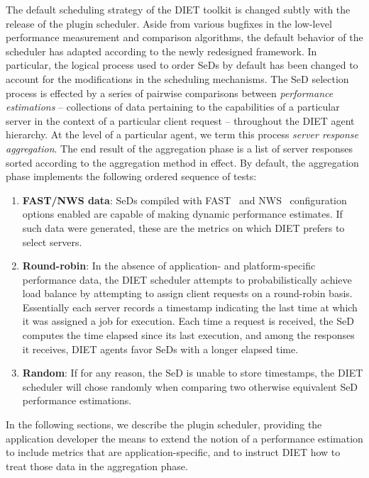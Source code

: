 The default scheduling strategy of the DIET toolkit is changed subtly
with the release of the plugin scheduler.  Aside from various bugfixes
in the low-level
performance measurement and comparison algorithms, the default
behavior of the scheduler has adapted according to the newly
redesigned framework.  In particular, the logical process used to
order SeDs by default has been changed to account for the
modifications in
the scheduling mechanisms.  The SeD selection process is effected by a
series of pairwise comparisons between
\emph{performance estimations} -- collections of data pertaining to
the capabilities of a particular server in the context of a particular
client request -- throughout the DIET agent hierarchy.  At the level
of a particular agent, we term this process
\emph{server response aggregation}.  The end result of the aggregation
phase is a list of server responses sorted according to the
aggregation method in effect.
By default, the aggregation phase
implements the following ordered sequence of tests:

\begin{enumerate}
\item \textbf{FAST/NWS data}: SeDs compiled with FAST~\cite{Qui02} and
  NWS~\cite{WSH99}
  configuration options enabled are capable of making dynamic
  performance estimates.  If such data
  were generated, these are the metrics on which DIET prefers to
  select servers.
\item \textbf{Round-robin}: In the absence of application- and
  platform-specific performance
  data, the DIET scheduler attempts to probabilistically achieve load
  balance by attempting to assign client requests on a round-robin
  basis.  Essentially each server records a timestamp indicating the
  last time at which it was assigned a job for execution.  Each time a
  request is received, the SeD computes the time elapsed since its
  last execution, and among the responses it receives, DIET agents
  favor SeDs with a longer elapsed time.
\item \textbf{Random}: If for any reason, the SeD is unable to store
  timestamps, the DIET scheduler will chose randomly when
  comparing two otherwise equivalent SeD performance estimations.
\end{enumerate}

In the following sections, we describe the plugin scheduler, providing
the application developer the means to extend the notion of a
performance estimation to include metrics that are
application-specific, and to instruct DIET how to treat those data in
the aggregation phase.


